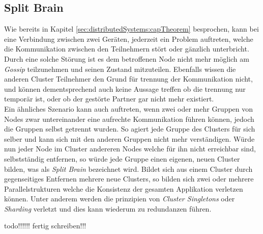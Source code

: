 \subsection{Split Brain} 
\label{subsec:implementation:splitBrain}
Wie bereits in Kapitel \ref{sec:distributedSystems:capTheorem} besprochen, kann bei eine Verbindung zwischen zwei Geräten, jederzeit ein Problem auftreten, welche die Kommunikation zwischen den Teilnehmern stört oder gänzlich unterbricht. Durch eine solche Störung ist es dem betroffenen Node nicht mehr möglich am \textit{Gossip} teilzunehmen und seinen Zustand mitzuteilen. Ebenfalls wissen die anderen Cluster Teilnehmer den Grund für trennung der Kommunikation nicht, und können dementsprechend auch keine Aussage treffen ob die trennung nur temporär ist, oder ob der gestörte Partner gar nicht mehr existiert. \\
Ein ähnliches Szenario kann auch auftreten, wenn zwei oder mehr Gruppen von Nodes zwar untereinander eine aufrechte Kommunikation führen können, jedoch die Gruppen selbst getrennt wurden. So agiert jede Gruppe des Clusters für sich selber und kann sich  mit den anderen Gruppen nicht mehr verständigen. Würde nun jeder Node im Cluster andereren Nodes welche für ihn nicht erreichbar sind, selbstständig entfernen, so würde jede Gruppe einen eigenen, neuen Cluster bilden, was als \textit{Split Brain} bezeichnet wird. Bildet sich aus einem Cluster durch gegenseitiges Entfernen mehrere neue Clusters, so bilden sich zwei oder mehrere Parallelstrukturen welche die Konsistenz der gesamten Applikation verletzen können. Unter anderem werden die prinzipien von \textit{Cluster Singletons} oder \textit{Sharding} verletzt und dies kann wiederum zu redundanzen führen.

todo!!!!!! fertig schreiben!!!
